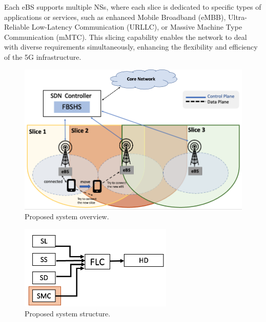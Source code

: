 \documentclass[graybox]{svmult}
\begin{document}
Each eBS supports multiple NSs, where each slice is dedicated to specific types of applications or services, such as enhanced Mobile Broadband (eMBB), Ultra-Reliable Low-Latency Communication (URLLC), or Massive Machine Type Communication (mMTC). This slicing capability enables the network to deal with diverse requirements simultaneously, enhancing the flexibility and efficiency of the 5G infrastructure.

\begin{figure}[h]\centering
	\includegraphics[width=1\textwidth]{figure/5GHO.png}
	\caption{Proposed system overview.}\label{fig:5GHO}
\end{figure}




\begin{figure}\centering
	\includegraphics[width=0.65\textwidth]{figure/System/HODFLC.png}%
	\caption{Proposed system structure.}\label{fig:FLC1}
\end{figure}
\end{document}
